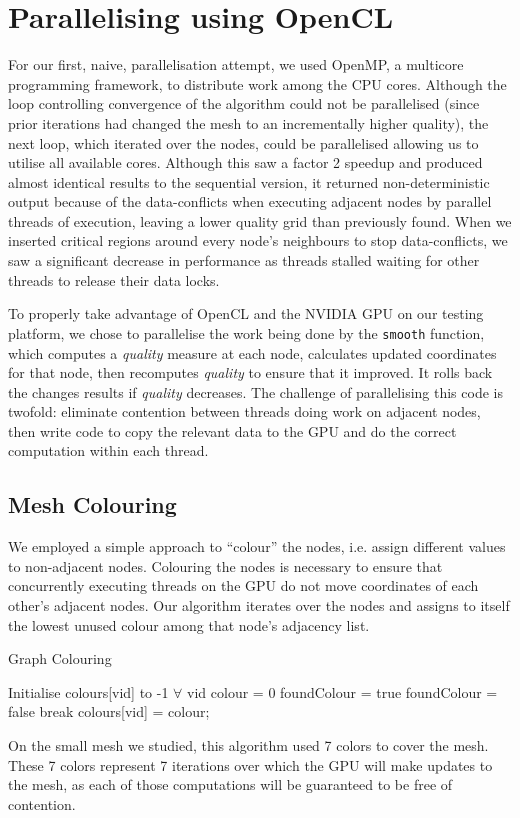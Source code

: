 \documentclass[a4paper,11pt, twocolumn]{article}
\begin{document}
\section{Parallelising using OpenCL}
For our first, naive, parallelisation attempt, we used OpenMP, a multicore programming framework, to distribute work among the CPU cores.
Although the loop controlling convergence of the algorithm could not be parallelised (since prior iterations had changed the mesh to an incrementally higher quality), the next loop, which iterated over the nodes, could be parallelised allowing us to utilise all available cores.
Although this saw a factor 2 speedup and produced almost identical results to the sequential version, it returned non-deterministic output because of the data-conflicts when executing adjacent nodes by parallel threads of execution, leaving a lower quality grid than previously found.
When we inserted critical regions around every node's neighbours to stop data-conflicts, we saw a significant decrease in performance as threads stalled waiting for other threads to release their data locks.

To properly take advantage of OpenCL and the NVIDIA GPU on our testing platform, we chose to parallelise the work being done by the \verb+smooth+ function, which computes a \emph{quality} measure at each node, calculates updated coordinates for that node, then recomputes \emph{quality} to ensure that it improved.
It rolls back the changes results if \emph{quality} decreases.
The challenge of parallelising this code is twofold: eliminate contention between threads doing work on adjacent nodes, then write code to copy the relevant data to the GPU and do the correct computation within each thread.

\subsection{Mesh Colouring}
We employed a simple approach to ``colour'' the nodes, i.e. assign different values to non-adjacent nodes.
Colouring the nodes is necessary to ensure that concurrently executing threads on the GPU do not move coordinates of each other's adjacent nodes.
Our algorithm iterates over the nodes and assigns to itself the lowest unused colour among that node's adjacency list.
\begin{algorithm}[H]
\caption{Graph Colouring}
\label{al:colour}
\begin{algorithmic}[1]
\STATE Initialise colours[vid] to -1 $\forall$ vid
  \STATE colour = 0
    \STATE foundColour = true
        \STATE foundColour = false
        \STATE break
      \ENDIF
    \ENDFOR
  \ENDWHILE
  \STATE colours[vid] = colour;
\ENDFOR
\end{algorithmic}
\end{algorithm}
On the small mesh we studied, this algorithm used 7 colors to cover the mesh.  These 7 colors represent 7 iterations over which the GPU will make updates to the mesh, as each of those computations will be guaranteed to be free of contention.  
\end{document}
